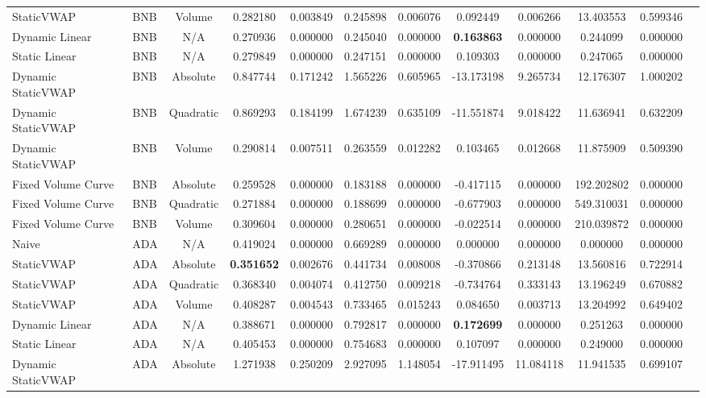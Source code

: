 \begin{table}[H]
{\begin{tabular}{llcccccccccc}
        StaticVWAP & BNB & Volume & 0.282180 & 0.003849 & 0.245898 & 0.006076 & 0.092449 & 0.006266 & 13.403553 & 0.599346 \\
        Dynamic Linear & BNB & N/A & 0.270936 & 0.000000 & 0.245040 & 0.000000 & \textbf{0.163863} & 0.000000 & 0.244099 & 0.000000 \\
        Static Linear & BNB & N/A & 0.279849 & 0.000000 & 0.247151 & 0.000000 & 0.109303 & 0.000000 & 0.247065 & 0.000000 \\
        Dynamic StaticVWAP & BNB & Absolute & 0.847744 & 0.171242 & 1.565226 & 0.605965 & -13.173198 & 9.265734 & 12.176307 & 1.000202 \\
        Dynamic StaticVWAP & BNB & Quadratic & 0.869293 & 0.184199 & 1.674239 & 0.635109 & -11.551874 & 9.018422 & 11.636941 & 0.632209 \\
        Dynamic StaticVWAP & BNB & Volume & 0.290814 & 0.007511 & 0.263559 & 0.012282 & 0.103465 & 0.012668 & 11.875909 & 0.509390 \\
        Fixed Volume Curve & BNB & Absolute & 0.259528 & 0.000000 & 0.183188 & 0.000000 & -0.417115 & 0.000000 & 192.202802 & 0.000000 \\
        Fixed Volume Curve & BNB & Quadratic & 0.271884 & 0.000000 & 0.188699 & 0.000000 & -0.677903 & 0.000000 & 549.310031 & 0.000000 \\
        Fixed Volume Curve & BNB & Volume & 0.309604 & 0.000000 & 0.280651 & 0.000000 & -0.022514 & 0.000000 & 210.039872 & 0.000000 \\
        \hline
        Naive & ADA & N/A & 0.419024 & 0.000000 & 0.669289 & 0.000000 & 0.000000 & 0.000000 & 0.000000 & 0.000000 \\
        StaticVWAP & ADA & Absolute & \textbf{0.351652} & 0.002676 & 0.441734 & 0.008008 & -0.370866 & 0.213148 & 13.560816 & 0.722914 \\
        StaticVWAP & ADA & Quadratic & 0.368340 & 0.004074 & 0.412750 & 0.009218 & -0.734764 & 0.333143 & 13.196249 & 0.670882 \\
        StaticVWAP & ADA & Volume & 0.408287 & 0.004543 & 0.733465 & 0.015243 & 0.084650 & 0.003713 & 13.204992 & 0.649402 \\
        Dynamic Linear & ADA & N/A & 0.388671 & 0.000000 & 0.792817 & 0.000000 & \textbf{0.172699} & 0.000000 & 0.251263 & 0.000000 \\
        Static Linear & ADA & N/A & 0.405453 & 0.000000 & 0.754683 & 0.000000 & 0.107097 & 0.000000 & 0.249000 & 0.000000 \\
        Dynamic StaticVWAP & ADA & Absolute & 1.271938 & 0.250209 & 2.927095 & 1.148054 & -17.911495 & 11.084118 & 11.941535 & 0.699107 \\

\end{tabular}}
\end{table}
